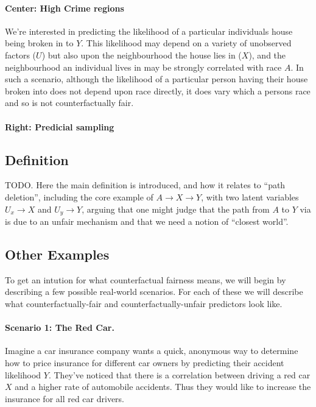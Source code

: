 \paragraph{Center: High Crime regions} We're interested in predicting the likelihood of a particular individuals house being broken in to $Y$. This likelihood may depend on a variety of unobserved factors ($U$) but also upon the neighbourhood the house lies in ($X$), and the neighbourhood an individual lives in may be strongly correlated with race $A$. In such a scenario, although the likelihood of a particular person having their house broken into does not depend upon race directly, it does vary which a persons race and so is not counterfactually fair.

\paragraph{Right: Predicial sampling}
\subsection{Definition}

TODO. Here the main definition is introduced, and how it relates to ``path deletion'',
including the core example of $A \rightarrow X \rightarrow Y$, with two latent
variables $U_x \rightarrow X$ and $U_y \rightarrow Y$, arguing that one might judge
that the path from $A$ to $Y$ via is due to an unfair mechanism and that we need a
notion of ``closest world''.

\subsection{Other Examples}
To get an intution for what counterfactual fairness means, we will begin by describing a few possible real-world scenarios. For each of these we will describe what counterfactually-fair and counterfactually-unfair predictors look like.

\paragraph{Scenario 1: The Red Car.}
Imagine a car insurance company wants a quick, anonymous way to determine how to price insurance for different car owners by predicting their accident likelihood $Y$. They've noticed that there is a correlation between driving a red car $X$ and a higher rate of automobile accidents. Thus they would like to increase the insurance for all red car drivers. 

